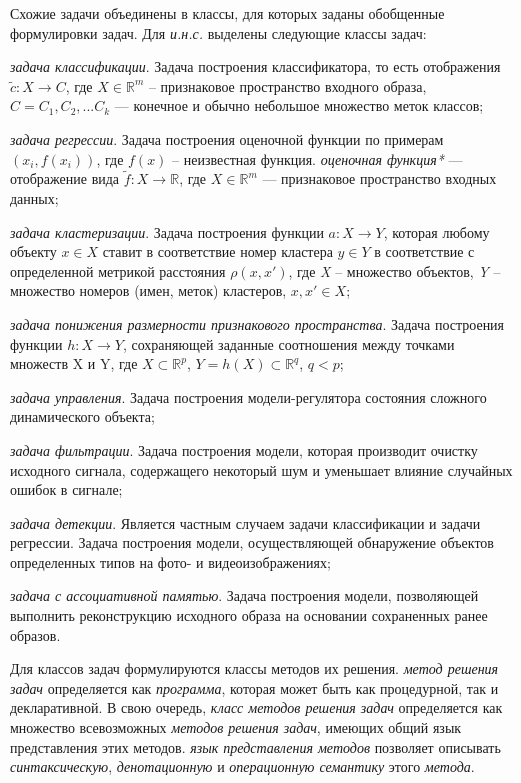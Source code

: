 Схожие задачи объединены в классы, для которых заданы обобщенные формулировки задач. Для \textit{и.н.с.} выделены следующие классы задач:
\begin{textitemize}
	\item \textit{задача классификации}. Задача построения классификатора, то есть отображения $\tilde c: X \rightarrow C$, где $ X \in \mathbb{R}^m$ -- признаковое пространство входного образа, $C = {C_1, C_2, ...C_k }$ --- конечное и обычно небольшое множество меток классов;
	\item \textit{задача регрессии}. Задача построения оценочной функции по примерам $(x_i, f(x_i))$, где $f(x)$ -- неизвестная функция. \textit{оценочная функция*} --- отображение вида $\tilde{f}: X \rightarrow \mathbb{R}$, где $X \in \mathbb{R}^m$ --- признаковое пространство входных данных;
	\item \textit{задача кластеризации}. Задача построения функции $a: X \rightarrow Y$, которая любому объекту $x \in X$ ставит в соответствие номер кластера $y \in Y$ в соответствие с определенной метрикой расстояния $\rho(x, x')$, где \textit{X} -- множество объектов, \textit{Y} -- множество номеров (имен, меток) кластеров, $x, x' \in X$;
	\item \textit{задача понижения размерности признакового пространства}. Задача построения функции $h: X \rightarrow Y$, сохраняющей заданные соотношения между точками множеств X и Y, где $X \subset \mathbb{R}^p$, $Y=h(X) \subset \mathbb{R}^q$, $q < p$;
	\item \textit{задача управления}. Задача построения модели-регулятора состояния сложного динамического объекта;
	\item \textit{задача фильтрации}. Задача построения модели, которая производит очистку исходного сигнала, содержащего некоторый шум и уменьшает влияние случайных ошибок в сигнале;
	\item \textit{задача детекции}. Является частным случаем задачи классификации и задачи регрессии. Задача построения модели, осуществляющей обнаружение объектов определенных типов на фото- и видеоизображениях;
	\item \textit{задача с ассоциативной памятью}. Задача построения модели, позволяющей выполнить реконструкцию исходного образа на основании сохраненных ранее образов.
\end{textitemize}

Для классов задач формулируются классы методов их решения. \textit{метод решения задач} определяется как \textit{программа}, которая может быть как процедурной, так и декларативной. В свою очередь, \textit{класс методов решения задач} определяется как множество всевозможных \textit{методов решения задач}, имеющих общий язык представления этих методов. \textit{язык представления методов} позволяет описывать \textit{синтаксическую}, \textit{денотационную} и \textit{операционную семантику} этого \textit{метода}.

